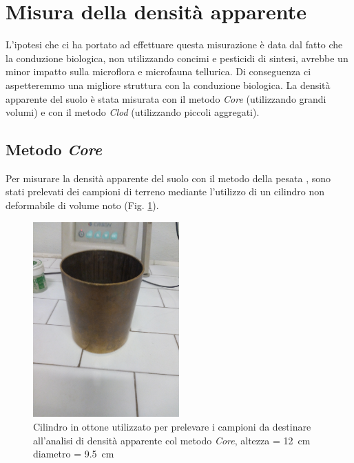 \documentclass[11pt, a4paper, openright, titlepage, final, language = italian]{book}
\begin{document}
\section{Misura della densit\`a apparente}
L'ipotesi che ci ha portato ad effettuare questa misurazione \`e data
dal fatto che la conduzione biologica, non utilizzando concimi e
pesticidi di sintesi, avrebbe un minor impatto sulla microflora e
microfauna tellurica. Di conseguenza ci aspetteremmo una migliore
struttura con la conduzione biologica.  La densit\`a apparente
del suolo è stata misurata con il metodo \emph{Core} (utilizzando grandi
volumi) e con il metodo \emph{Clod} (utilizzando piccoli aggregati).

\subsection{Metodo \emph{Core}}%
Per misurare la densit\`a apparente del suolo con il metodo della
pesata \citep{ugolini2010basi}, sono stati prelevati dei campioni di
terreno mediante l'utilizzo di un cilindro non deformabile di volume
noto (Fig. \ref{fig:cilindro}). 


\begin{figure}[ht]
  \centering
  \includegraphics[width=0.5\textwidth]{../foto/cilindroOttone.jpeg}
  
  \caption{Cilindro in ottone utilizzato per prelevare i campioni da
    destinare all'analisi di densit\`a apparente col metodo
    \emph{Core}, altezza = \SI{12}{\centi\metre}
    diametro = \SI{9.5}{\centi\metre} }
  \label{fig:cilindro}
\end{figure}
\end{document}
